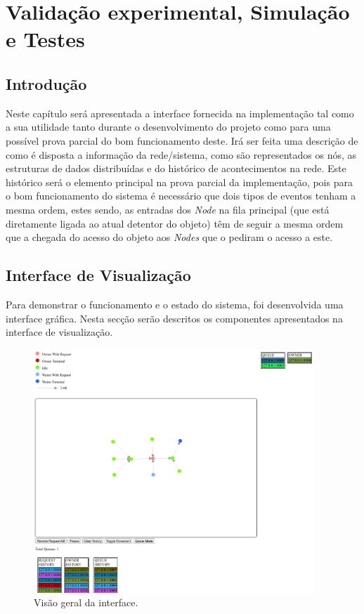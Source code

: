 \chapter{Validação experimental, Simulação e Testes}
\label{chap:validacao}

\section{Introdução}
\label{validacao:sec:introducao}
Neste capítulo será apresentada a interface fornecida na implementação tal como a sua utilidade tanto
durante o desenvolvimento do projeto como para uma possível prova parcial do bom funcionamento deste.
Irá ser feita uma descrição de como é disposta a informação da rede/sistema, como são representados os
nós, as estruturas de dados distribuídas e do histórico de acontecimentos na rede.
Este histórico será o elemento principal na prova parcial da implementação, pois para o bom funcionamento 
do sistema é necessário que dois tipos de eventos tenham a mesma ordem, estes sendo, as entradas dos \emph{Node} 
na fila principal (que está diretamente ligada ao atual detentor do objeto) têm de seguir a mesma ordem que a chegada do
acesso do objeto aos \emph{Nodes} que o pediram o acesso a este.

\section{Interface de Visualização}
\label{validacao:sec:interface}
Para demonstrar o funcionamento e o estado do sistema, foi desenvolvida uma interface gráfica. Nesta secção serão descritos os componentes apresentados na interface de visualização.

\begin{figure}[!htb]
\centering
\includegraphics[width=300pt]{relatorio_overview.png}
\caption{Visão geral da interface.}
\end{figure}

